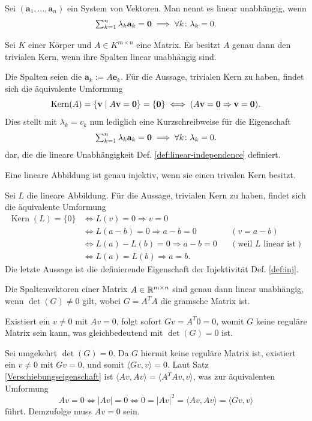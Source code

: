 \begin{Definition}\label{def:linear-independence}
Sei $(\mathbf a_1,\ldots, \mathbf a_n)$ ein System von Vektoren.
Man nennt es linear unabhängig, wenn
\[\textstyle\sum_{k=1}^n \lambda_k\mathbf{a}_k = \mathbf{0}
\implies \forall k\colon\lambda_k = 0.\]
\end{Definition}

\begin{Korollar}
Sei $K$ einer Körper und $A\in K^{m\times n}$ eine Matrix. Es besitzt
$A$ genau dann den trivialen Kern, wenn ihre Spalten linear
unabhängig sind.
\end{Korollar}
\begin{Beweis} Die Spalten seien die $\mathbf a_k := A\mathbf e_k$.
Für die Aussage, trivialen Kern zu haben, findet sich die
äquivalente Umformung
\[\operatorname{Kern}(A) = \{\mathbf v\mid A\mathbf{v} = \mathbf{0}\} = \{\mathbf{0}\}
\iff (A\mathbf{v} = \mathbf{0} \Rightarrow \mathbf{v} = \mathbf{0}).\]
Dies stellt mit $\lambda_k = v_k$ nun lediglich eine Kurzschreibweise
für die Eigenschaft
\[\textstyle\sum_{k=1}^n \lambda_k\mathbf{a}_k = \mathbf{0}\implies \forall k\colon\lambda_k = 0.\]
dar, die die lineare Unabhängigkeit Def. \ref{def:linear-independence}
definiert.\,\qedsymbol
\end{Beweis}

\begin{Korollar}
Eine lineare Abbildung ist genau injektiv, wenn sie einen trivalen
Kern besitzt.
\end{Korollar}
\begin{Beweis} Sei $L$ die lineare Abbildung. Für die Aussage,
trivialen Kern zu haben, findet sich die äquivalente Umformung
\begin{align*}
\operatorname{Kern}(L) = \{0\}
&\iff L(v) = 0\Rightarrow v = 0\\
&\iff L(a-b) = 0\Rightarrow a - b = 0 && (v = a - b)\\
&\iff L(a) - L(b) = 0\Rightarrow a - b = 0 && (\text{weil $L$ linear ist})\\
&\iff L(a) = L(b) \Rightarrow a = b.
\end{align*}
Die letzte Aussage ist die definierende Eigenschaft
der Injektivität Def. \ref{def:inj}.\,\qedsymbol
\end{Beweis}

\begin{Satz}\label{gram-det-nonzero}
Die Spaltenvektoren einer Matrix $A\in\mathbb R^{m\times n}$ sind
genau dann linear unabhängig, wenn $\det(G)\ne 0$ gilt, wobei
$G=A^T A$ die gramsche Matrix ist.
\end{Satz}
\begin{Beweis}
Existiert ein $v\ne 0$ mit $Av = 0$, folgt sofort $Gv = A^T 0 = 0$,
womit $G$ keine reguläre Matrix sein kann, was gleichbedeutend
mit $\det(G)=0$ ist.

Sei umgekehrt $\det(G)=0$. Da $G$ hiermit keine reguläre Matrix ist,
existiert ein $v\ne 0$ mit $Gv=0$, und somit $\langle Gv,v\rangle = 0$.
Laut Satz \ref{Verschiebungseigenschaft}
ist $\langle Av,Av\rangle = \langle A^T A v,v\rangle$, was zur äquivalenten
Umformung
\[Av = 0\iff |Av| = 0\iff 0 = |Av|^2 = \langle Av,Av\rangle = \langle Gv,v\rangle\]
führt. Demzufolge muss $Av = 0$ sein.\,\qedsymbol
\end{Beweis}


